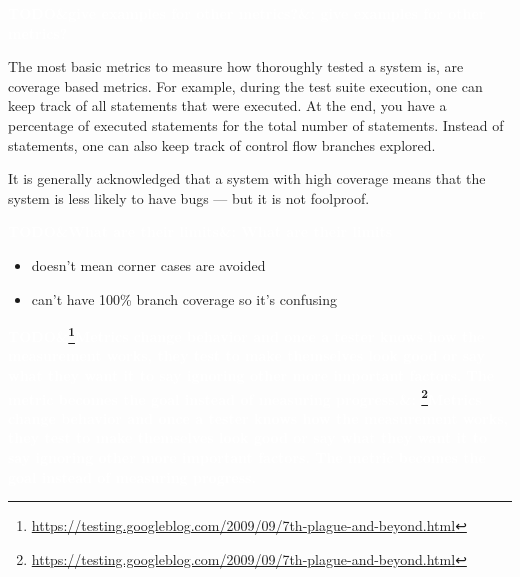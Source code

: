 \documentclass[11pt]{sdm_internship}
\newcommand{\todo}[1]{\colorbox{Red!75}{\textcolor{white}{\textbf{TODO\ifx&#1&\else: #1\fi}}}}
\theoremstyle{definition}
\begin{document}
\todo{give examples for other metrics?}

The most basic metrics to measure how thoroughly tested a system is, are coverage based metrics.
For example, during the test suite execution, one can keep track of all statements that were executed.
At the end, you have a percentage of executed statements for the total number of statements.
Instead of statements, one can also keep track of control flow branches explored.

It is generally acknowledged that a system with high coverage means that the system is less likely to have bugs ---  but it is not foolproof.

\todo{What are their limits}
\begin{itemize}
  \item doesn't mean corner cases are avoided
  \item can't have 100\% branch coverage so it's confusing
\end{itemize}

\todo{\footnote{\url{https://testing.googleblog.com/2009/09/7th-plague-and-beyond.html}}Metrics change behavior and once a tester knows how the measurement works, they test to make themselves look good or say what they want it to say ignoring other more important factors. The metric becomes the goal instead of measuring progress.}

\end{document}
